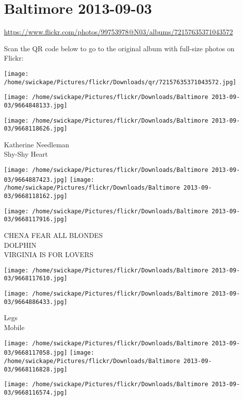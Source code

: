 \documentclass[10pt,letterpaper]{article}
\title{}
\author{}
\date{}
\begin{document}
\section*{Baltimore 2013-09-03}

\url{https://www.flickr.com/photos/99753978@N03/albums/72157635371043572}

Scan the QR code below to go to the original album with full-size photos on Flickr:

\texttt{[image: /home/swickape/Pictures/flickr/Downloads/qr/72157635371043572.jpg]}
\pagebreak

\texttt{[image: /home/swickape/Pictures/flickr/Downloads/Baltimore 2013-09-03/9664848133.jpg]}

\vspace{0.25in}
\texttt{[image: /home/swickape/Pictures/flickr/Downloads/Baltimore 2013-09-03/9668118626.jpg]}

Katherine Needleman\\
Shy{-}Shy Heart
\pagebreak

\texttt{[image: /home/swickape/Pictures/flickr/Downloads/Baltimore 2013-09-03/9664887423.jpg]}
\texttt{[image: /home/swickape/Pictures/flickr/Downloads/Baltimore 2013-09-03/9668118162.jpg]}

\vspace{0.25in}
\texttt{[image: /home/swickape/Pictures/flickr/Downloads/Baltimore 2013-09-03/9668117916.jpg]}

CHENA FEAR ALL BLONDES\\
DOLPHIN\\
VIRGINIA IS FOR LOVERS
\pagebreak

\texttt{[image: /home/swickape/Pictures/flickr/Downloads/Baltimore 2013-09-03/9668117610.jpg]}

\vspace{0.25in}
\texttt{[image: /home/swickape/Pictures/flickr/Downloads/Baltimore 2013-09-03/9664886433.jpg]}

Legs\\
Mobile
\pagebreak

\texttt{[image: /home/swickape/Pictures/flickr/Downloads/Baltimore 2013-09-03/9668117058.jpg]}
\texttt{[image: /home/swickape/Pictures/flickr/Downloads/Baltimore 2013-09-03/9668116828.jpg]}

\vspace{0.25in}
\texttt{[image: /home/swickape/Pictures/flickr/Downloads/Baltimore 2013-09-03/9668116574.jpg]}
\end{document}
